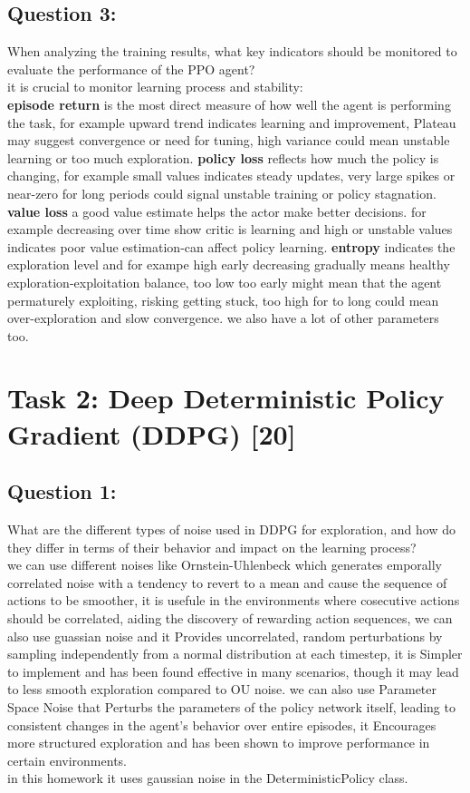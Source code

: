 \documentclass[12pt]{article}
\begin{document}
{{{\subsection{Question 3:} When analyzing the training results, what key indicators should be monitored to evaluate the performance of the PPO agent?\\
it is crucial to monitor learning process and stability:\\
\textbf{episode return} is the most direct measure of how well the agent is performing the task,
for example upward trend indicates learning and improvement, Plateau may suggest convergence or need for tuning, high variance could mean unstable learning or too much exploration.
\textbf{policy loss} reflects how much the policy is changing, for example small values indicates steady updates, very large spikes or near-zero for long periods could signal unstable training or policy stagnation.
\textbf{value loss} a good value estimate helps the actor make better decisions. for example decreasing over time show critic is learning and high or unstable values indicates poor value estimation-can affect policy learning.
\textbf{entropy} indicates the exploration level and for exampe high early decreasing gradually means healthy exploration-exploitation balance, too low too early might mean that the agent permaturely exploiting, risking getting stuck, too high for to long could mean over-exploration and slow convergence.
we also have a lot of other parameters too.


\newpage

\section{Task 2: Deep Deterministic Policy Gradient (DDPG) [20]}

\subsection{Question 1:}

What are the different types of noise used in DDPG for exploration, and how do they differ in terms of their behavior and impact on the learning process?\\ 
we can use different noises like Ornstein-Uhlenbeck which generates emporally correlated noise with a tendency to revert to a mean and cause the sequence of actions to be smoother, it is usefule in the environments where cosecutive actions should be correlated, aiding the discovery of rewarding action sequences, we can also use guassian noise and it Provides uncorrelated, random perturbations by sampling independently from a normal distribution at each timestep, it is Simpler to implement and has been found effective in many scenarios, though it may lead to less smooth exploration compared to OU noise. we can also use Parameter Space Noise that Perturbs the parameters of the policy network itself, leading to consistent changes in the agent's behavior over entire episodes, it  Encourages more structured exploration and has been shown to improve performance in certain environments.\\
in this homework it uses gaussian noise in the DeterministicPolicy class.

}}}
\end{document}
